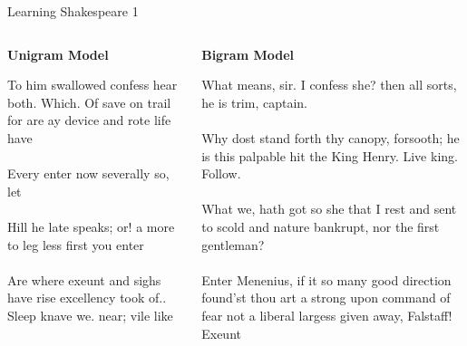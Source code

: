 \documentclass[dvipsnames,mathserif]{beamer}
\newcommand{\footlineextra}[1]{\gdef\insertfootlineextra{#1}}
\def\lsep{\\ \mbox{ } \\}
\begin{document}
{\begin{frame}{Learning Shakespeare 1}
\vspace{2mm}
  \begin{columns}[t] 
    \begin{column}{0.5\textwidth}
      \vspace{-0.8cm}
      \begin{center}
        \textbf{Unigram Model}
      \end{center}
      To him swallowed confess hear both. Which. Of save on trail for are ay
      device and rote life have 
      \lsep
      Every enter now severally so, let 
      \lsep
      Hill he late speaks; or! a more to leg less first you enter
      \lsep   
      Are where exeunt and sighs have rise excellency took of.. Sleep
      knave we. near; vile like
    \end{column}
    \begin{column}{0.5\textwidth}
      \vspace{-0.8cm}
      \begin{center}
        \textbf{Bigram Model}
      \end{center}
      What means, sir. I confess she? then all sorts, he is trim,
      captain. 
      \lsep
      Why dost stand forth thy canopy, forsooth; he is this
      palpable hit the King Henry. Live king. Follow. 
      \lsep
      What we, hath got so
      she that I rest and sent to scold and nature bankrupt, nor the first
      gentleman? 
      \lsep
      Enter Menenius, if it so many good direction found'st thou
      art a strong upon command of fear not a liberal largess given away,
      Falstaff! Exeunt
    \end{column}
  \end{columns}
  \vspace{2cm}
  \footlineextra{From Jurafsky and Martin, "Speech and Language
    Processing", 2009.}
\end{frame}


}
\end{document}
